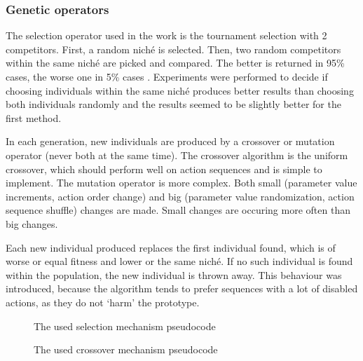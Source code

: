 \subsubsection{Genetic operators}

The selection operator used in the work is the tournament selection with 2 competitors. First, a random niché is selected. Then, two random competitors within the same niché are picked and compared. The better is returned in 95\% cases, the worse one in 5\% cases \cite{tournament}. Experiments were performed to decide if choosing individuals within the same niché produces better results than choosing both individuals randomly and the results seemed to be slightly better for the first method.

In each generation, new individuals are produced by a crossover or mutation operator (never both at the same time). The crossover algorithm is the uniform crossover, which should perform well on action sequences and is simple to implement. The mutation operator is more complex. Both small (parameter value increments, action order change) and big (parameter value randomization, action sequence shuffle) changes are made. Small changes are occuring more often than big changes. 

Each new individual produced replaces the first individual found, which is of worse or equal fitness and lower or the same niché. If no such individual is found within the population, the new individual is thrown away. This behaviour was introduced, because the algorithm tends to prefer sequences with a lot of disabled actions, as they do not `harm' the prototype. 

\begin{figure}
\centering
\begin{algorithmic}[1]
  \ELSE
  \ENDIF
\end{algorithmic}
\caption{The used selection mechanism pseudocode}
\label{fig:tournament}
\end{figure}

\begin{figure}
\centering
\begin{algorithmic}[1]
    \ELSE
    \ENDIF
  \ENDFOR
\end{algorithmic}
\caption{The used crossover mechanism pseudocode}
\label{fig:tournament}
\end{figure}
